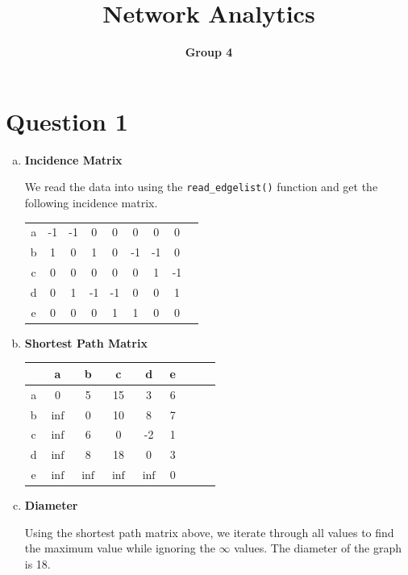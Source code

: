 \documentclass[a4paper]{article}
\begin{document}
\title{Network Analytics}
\author{\bf Group 4}
\maketitle
\section*{Question 1}

\begin{enumerate}[(a)]
\item \textbf{Incidence Matrix}

We read the data into using the \texttt{read\_edgelist()} function and get the following incidence matrix.
\begin{table}[ht]
\begin{center}
\begin{tabular}{c|cccccccc}
a & -1 & -1 	& 0 	& 0 	& 0	& 0	&0\\
b &1 	& 0	& 1 	& 0	& -1	& -1	& 0\\
c &0 	& 0 	& 0 	& 0	&0	&1	&-1\\
d & 0 	& 1 	& -1 	& -1	& 0	&0	&1\\
e & 0 	& 0 	& 0 	& 1	& 1	&0	&0
\end{tabular}
\end{center}
\end{table}

\item \textbf{Shortest Path Matrix}

\begin{table}[ht]
\begin{center}
\begin{tabular}{c|cccccccc}
& a & b & c & d & e\\
\hline
a & 0 		& 5	& 15	& 3 	& 6\\
b &$\inf$ 	& 0	& 10 	& 8	& 7\\
c &$\inf$ 	& 6 	& 0 	& -2	& 1\\
d &$\inf$ 	& 8 	& 18 	& 0	& 3\\
e &$\inf$ 	&$\inf$& $\inf$& $\inf$	& 0
\end{tabular}
\end{center}
\end{table}

\item \textbf{Diameter}

Using the shortest path matrix above, we iterate through all values to find the maximum value while ignoring the $\infty$ values. The diameter of the graph is 18.


\end{enumerate}
\end{document}
